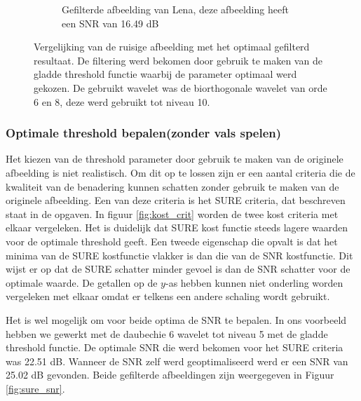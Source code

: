 \begin{figure}
\begin{subfigure}[b]{0.4\textwidth}
        \caption{Gefilterde afbeelding van Lena, deze afbeelding heeft een SNR van 16.49 dB }
        \label{fig:opt_lena}
    \end{subfigure}
    \caption{Vergelijking van de ruisige afbeelding met het optimaal gefilterd resultaat. De filtering werd bekomen door gebruik te maken van de gladde threshold functie waarbij de parameter optimaal werd gekozen. De gebruikt wavelet was de biorthogonale wavelet van orde 6 en 8, deze werd gebruikt tot niveau 10.}\label{fig:optimaleRuisBIOR}
\end{figure}


\subsubsection{Optimale threshold bepalen(zonder vals spelen)}

Het kiezen van de threshold parameter door gebruik te maken van de originele afbeelding is niet realistisch.
Om dit op te lossen zijn er een aantal criteria die de kwaliteit van de benadering kunnen schatten zonder gebruik te maken van de originele afbeelding.
Een van deze criteria is het SURE  criteria, dat beschreven staat in de opgaven.
In figuur \ref{fig:kost_crit}  worden de twee kost criteria met elkaar vergeleken.
Het is duidelijk dat SURE kost functie steeds lagere waarden voor de optimale threshold geeft.
Een tweede eigenschap die opvalt is dat het minima van de SURE kostfunctie vlakker is dan die van de SNR kostfunctie.
Dit wijst er op dat de SURE schatter minder gevoel is dan de SNR schatter voor de optimale waarde.
De getallen op de $ y$-as hebben kunnen niet onderling worden vergeleken met elkaar omdat er telkens een andere schaling wordt gebruikt.

Het is wel mogelijk om voor beide optima de SNR te bepalen.
In ons voorbeeld hebben we gewerkt met de daubechie 6 wavelet tot niveau 5 met de gladde threshold functie.
De optimale SNR die werd bekomen voor het SURE criteria was 22.51 dB.
Wanneer de SNR zelf werd geoptimaliseerd werd er een SNR van 25.02 dB gevonden.
Beide gefilterde afbeeldingen zijn weergegeven in Figuur \ref{fig:sure_snr}.


